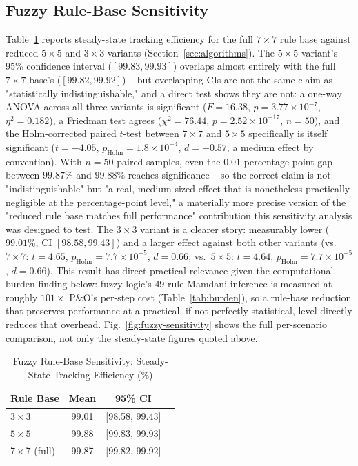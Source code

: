 \subsection{Fuzzy Rule-Base Sensitivity}
Table~\ref{tab:fuzzy-sensitivity} reports steady-state tracking efficiency
for the full $7\times7$ rule base against reduced $5\times5$ and
$3\times3$ variants (Section~\ref{sec:algorithms}). The $5\times5$
variant's 95\% confidence interval ($[99.83, 99.93]$) overlaps almost
entirely with the full $7\times7$ base's ($[99.82, 99.92]$) -- but
overlapping CIs are not the same claim as "statistically
indistinguishable," and a direct test shows they are not: a one-way ANOVA
across all three variants is significant ($F=16.38$, $p=3.77\times10^{-7}$,
$\eta^2=0.182$), a Friedman test agrees ($\chi^2=76.44$,
$p=2.52\times10^{-17}$, $n=50$), and the Holm-corrected paired $t$-test
between $7\times7$ and $5\times5$ specifically is itself significant
($t=-4.05$, $p_{\text{Holm}}=1.8\times10^{-4}$, $d=-0.57$, a medium effect
by convention). With $n=50$ paired samples, even the $0.01$ percentage
point gap between $99.87\%$ and $99.88\%$ reaches significance -- so the
correct claim is not "indistinguishable" but "a real, medium-sized effect
that is nonetheless practically negligible at the percentage-point level,"
a materially more precise version of the "reduced rule base matches full
performance" contribution this sensitivity analysis was designed to test.
The $3\times3$ variant is a clearer story: measurably lower ($99.01\%$, CI
$[98.58, 99.43]$) and a larger effect against both other variants (vs.\
$7\times7$: $t=4.65$, $p_{\text{Holm}}=7.7\times10^{-5}$, $d=0.66$; vs.\
$5\times5$: $t=4.64$, $p_{\text{Holm}}=7.7\times10^{-5}$, $d=0.66$). This
result has direct practical relevance given the computational-burden
finding below: fuzzy logic's $49$-rule Mamdani inference is measured at
roughly $101\times$ P\&O's per-step cost (Table~\ref{tab:burden}), so a
rule-base reduction that preserves performance at a practical, if not
perfectly statistical, level directly reduces that overhead.
Fig.~\ref{fig:fuzzy-sensitivity} shows the full per-scenario comparison,
not only the steady-state figures quoted above.

\begin{table}[htbp]
\centering
\caption{Fuzzy Rule-Base Sensitivity: Steady-State Tracking Efficiency (\%)}
\label{tab:fuzzy-sensitivity}
\begin{tabular}{@{}lccc@{}}
\toprule
Rule Base & Mean & 95\% CI \\
\midrule
$3\times3$ & 99.01 & [98.58, 99.43] \\
$5\times5$ & 99.88 & [99.83, 99.93] \\
$7\times7$ (full) & 99.87 & [99.82, 99.92] \\
\bottomrule
\end{tabular}
\end{table}

